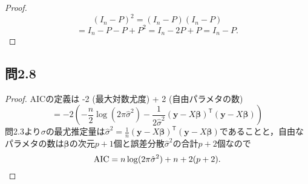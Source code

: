 \documentclass[pdflatex,ja=standard]{bxjsarticle}
\begin{document}
\begin{proof}
\begin{equation}
(I_n - P)^2 = (I_n - P) (I_n - P)
\end{equation}
\begin{equation}
= I_n - P - P + P^2 = I_n - 2P + P = I_n - P.
\end{equation}
\end{proof}

\subsection*{問2.8}
\begin{proof}
AICの定義は -2 (最大対数尤度) + 2 (自由パラメタの数)
\begin{equation}
= -2 \left( - \frac{n}{2} \log (2 \pi \hat{\sigma}^2) - \frac{1}{2 \hat{\sigma}^2} (\bm{y} - X \bm{\beta})^{\mathsf{T}} (\bm{y} - X \bm{\beta}) \right)
\end{equation}
問2.3より$\sigma$の最尤推定量は$\hat{\sigma}^2 = \frac{1}{n} (\bm{y} - X \bm{\beta})^{\mathsf{T}} (\bm{y} - X \bm{\beta})$であることと，自由なパラメタの数は$\bm{\beta}$の次元$p+1$個と誤差分散$\hat{\sigma}^2$の合計$p+2$個なので
\begin{equation}
{\rm AIC} = n \log (2 \pi \hat{\sigma}^2) + n + 2(p + 2).
\end{equation}
\end{proof}
\end{document}
